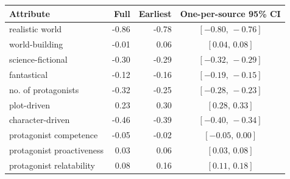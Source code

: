 \begin{tabular}{l r r c}
\toprule
Attribute & Full & Earliest & One-per-source 95\% CI \\
\midrule
realistic world & -0.86 & -0.78 & $[-0.80,\,-0.76]$ \\
world-building & -0.01 & 0.06 & $[0.04,\,0.08]$ \\
science-fictional & -0.30 & -0.29 & $[-0.32,\,-0.29]$ \\
fantastical & -0.12 & -0.16 & $[-0.19,\,-0.15]$ \\
no. of protagonists & -0.32 & -0.25 & $[-0.28,\,-0.23]$ \\
plot-driven & 0.23 & 0.30 & $[0.28,\,0.33]$ \\
character-driven & -0.46 & -0.39 & $[-0.40,\,-0.34]$ \\
protagonist competence & -0.05 & -0.02 & $[-0.05,\,0.00]$ \\
protagonist proactiveness & 0.03 & 0.06 & $[0.03,\,0.08]$ \\
protagonist relatability & 0.08 & 0.16 & $[0.11,\,0.18]$ \\
\bottomrule
\end{tabular}